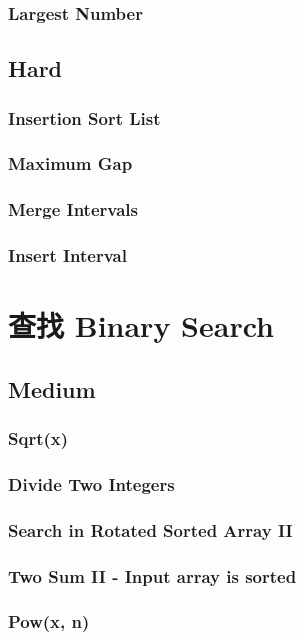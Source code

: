 \documentclass[12pt]{book}
\begin{document}
\subsection{Largest Number}
\label{sec-9-1-3}
\section{Hard}
\label{sec-9-2}
\subsection{Insertion Sort List}
\label{sec-9-2-1}
\subsection{Maximum Gap}
\label{sec-9-2-2}
\subsection{Merge Intervals}
\label{sec-9-2-3}
\subsection{Insert Interval}
\label{sec-9-2-4}

\chapter{查找 Binary Search}
\label{sec-10}
\section{Medium}
\label{sec-10-1}
\subsection{Sqrt(x)}
\label{sec-10-1-1}
\subsection{Divide Two Integers}
\label{sec-10-1-2}
\subsection{Search in Rotated Sorted Array II}
\label{sec-10-1-3}
\subsection{Two Sum II - Input array is sorted}
\label{sec-10-1-4}
\subsection{Pow(x, n)}
\label{sec-10-1-5}
\end{document}
